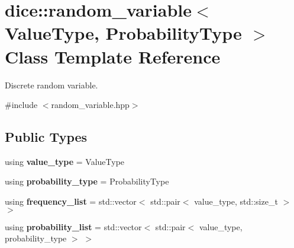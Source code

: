 \hypertarget{classdice_1_1random__variable}{}\section{dice\+:\+:random\+\_\+variable$<$ Value\+Type, Probability\+Type $>$ Class Template Reference}
\label{classdice_1_1random__variable}


Discrete random variable.  




{\ttfamily \#include $<$random\+\_\+variable.\+hpp$>$}

\subsection*{Public Types}
\begin{DoxyCompactItemize}
\item 
\mbox{\label{classdice_1_1random__variable_ac9c699272072661cfddd880bd7bdf81b}} 
using {\bfseries value\+\_\+type} = Value\+Type
\item 
\mbox{\label{classdice_1_1random__variable_a38b4f4b7d42d5d5a6b9688bf03fab469}} 
using {\bfseries probability\+\_\+type} = Probability\+Type
\item 
\mbox{\label{classdice_1_1random__variable_abb6c151c9168391112bd1fc279f1984f}} 
using {\bfseries frequency\+\_\+list} = std\+::vector$<$ std\+::pair$<$ value\+\_\+type, std\+::size\+\_\+t $>$ $>$
\item 
\mbox{\label{classdice_1_1random__variable_ab17dc25c146a0673d2b7aa14c997b2d6}} 
using {\bfseries probability\+\_\+list} = std\+::vector$<$ std\+::pair$<$ value\+\_\+type, probability\+\_\+type $>$ $>$
\end{DoxyCompactItemize}
